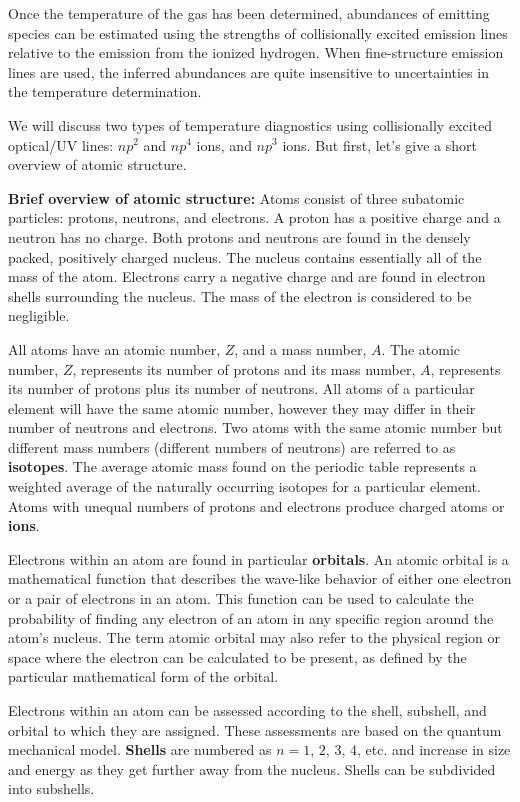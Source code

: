 \documentclass[a4paper,10pt]{article}
\begin{document}
{\noindent}Once the temperature of the gas has been determined, abundances of emitting species can be estimated using the strengths of collisionally excited emission lines relative to the emission from the ionized hydrogen. When fine-structure emission lines are used, the inferred abundances are quite insensitive to uncertainties in the temperature determination.

{\noindent}We will discuss two types of temperature diagnostics using collisionally excited optical/UV lines: $np^2$ and $np^4$ ions, and $np^3$ ions. But first, let's give a short overview of atomic structure.

{\noindent}\textbf{Brief overview of atomic structure:} Atoms consist of three subatomic particles: protons, neutrons, and electrons. A proton has a positive charge and a neutron has no charge. Both protons and neutrons are found in the densely packed, positively charged nucleus. The nucleus contains essentially all of the mass of the atom. Electrons carry a negative charge and are found in electron shells surrounding the nucleus. The mass of the electron is considered to be negligible.

{\noindent}All atoms have an atomic number, $Z$, and a mass number, $A$. The atomic number, $Z$, represents its number of protons and its mass number, $A$, represents its number of protons plus its number of neutrons. All atoms of a particular element will have the same atomic number, however they may differ in their number of neutrons and electrons. Two atoms with the same atomic number but different mass numbers (different numbers of neutrons) are referred to as \textbf{isotopes}. The average atomic mass found on the periodic table represents a weighted average of the naturally occurring isotopes for a particular element. Atoms with unequal numbers of protons and electrons produce charged atoms or \textbf{ions}.

{\noindent}Electrons within an atom are found in particular \textbf{orbitals}. An atomic orbital is a mathematical function that describes the wave-like behavior of either one electron or a pair of electrons in an atom. This function can be used to calculate the probability of finding any electron of an atom in any specific region around the atom's nucleus. The term atomic orbital may also refer to the physical region or space where the electron can be calculated to be present, as defined by the particular mathematical form of the orbital. 

{\noindent}Electrons within an atom can be assessed according to the shell, subshell, and orbital to which they are assigned. These assessments are based on the quantum mechanical model. \textbf{Shells} are numbered as $n=1$, $2$, $3$, $4$, etc. and increase in size and energy as they get further away from the nucleus. Shells can be subdivided into subshells.
\end{document}
